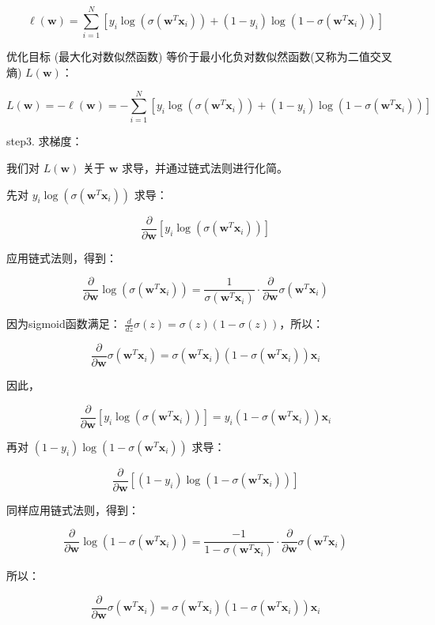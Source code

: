 \documentclass{article}
\begin{document}
\[
\ell(\mathbf{w}) = \sum_{i=1}^{N} \left[ y_i \log(\sigma(\mathbf{w}^T \mathbf{x}_i)) + (1 - y_i) \log(1 - \sigma(\mathbf{w}^T \mathbf{x}_i)) \right]
\]

优化目标 (最大化对数似然函数) 等价于最小化负对数似然函数(又称为二值交叉熵) \( L(\mathbf{w}) \)：

\[
L(\mathbf{w}) = - \ell(\mathbf{w}) = - \sum_{i=1}^{N} \left[ y_i \log(\sigma(\mathbf{w}^T \mathbf{x}_i)) + (1 - y_i) \log(1 - \sigma(\mathbf{w}^T \mathbf{x}_i)) \right]
\]

step3. 求梯度：

我们对 \( L(\mathbf{w}) \) 关于 \( \mathbf{w} \) 求导，并通过链式法则进行化简。

先对 \( y_i \log(\sigma(\mathbf{w}^T \mathbf{x}_i)) \) 求导：

\[
\frac{\partial}{\partial \mathbf{w}} \left[ y_i \log(\sigma(\mathbf{w}^T \mathbf{x}_i)) \right]
\]

应用链式法则，得到：

\[
\frac{\partial}{\partial \mathbf{w}} \log(\sigma(\mathbf{w}^T \mathbf{x}_i)) = \frac{1}{\sigma(\mathbf{w}^T \mathbf{x}_i)} \cdot \frac{\partial}{\partial \mathbf{w}} \sigma(\mathbf{w}^T \mathbf{x}_i)
\]

因为sigmoid函数满足： \( \frac{d}{dz} \sigma(z) = \sigma(z)(1 - \sigma(z)) \)，所以：

\[
\frac{\partial}{\partial \mathbf{w}} \sigma(\mathbf{w}^T \mathbf{x}_i) = \sigma(\mathbf{w}^T \mathbf{x}_i) \left( 1 - \sigma(\mathbf{w}^T \mathbf{x}_i) \right) \mathbf{x}_i
\]

因此，

\[
\frac{\partial}{\partial \mathbf{w}} \left[ y_i \log(\sigma(\mathbf{w}^T \mathbf{x}_i)) \right] = y_i \left( 1 - \sigma(\mathbf{w}^T \mathbf{x}_i) \right) \mathbf{x}_i
\]

再对 \( (1 - y_i) \log(1 - \sigma(\mathbf{w}^T \mathbf{x}_i)) \) 求导：

\[
\frac{\partial}{\partial \mathbf{w}} \left[ (1 - y_i) \log(1 - \sigma(\mathbf{w}^T \mathbf{x}_i)) \right]
\]

同样应用链式法则，得到：

\[
\frac{\partial}{\partial \mathbf{w}} \log(1 - \sigma(\mathbf{w}^T \mathbf{x}_i)) = \frac{-1}{1 - \sigma(\mathbf{w}^T \mathbf{x}_i)} \cdot \frac{\partial}{\partial \mathbf{w}} \sigma(\mathbf{w}^T \mathbf{x}_i)
\]

所以：

\[
\frac{\partial}{\partial \mathbf{w}} \sigma(\mathbf{w}^T \mathbf{x}_i) = \sigma(\mathbf{w}^T \mathbf{x}_i) \left( 1 - \sigma(\mathbf{w}^T \mathbf{x}_i) \right) \mathbf{x}_i
\]
\end{document}
